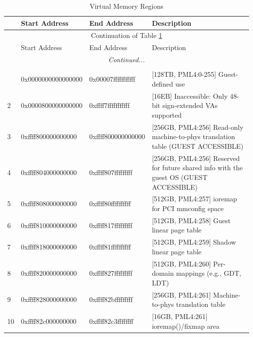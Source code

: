 \clearpage
\begin{longtable}{|m{2ex}|m{20ex}|m{18ex}|m{}|}
    \caption[Virtual Memory Regions]{Virtual Memory Regions \cite{xen_code} \label{tab:xen_address}}\\
    \hline
    & Start Address      & End Address        & Description \\
    \hline
    \hline
    \endfirsthead
    \hline
    \multicolumn{4}{|c|}{Continuation of Table \ref{tab:xen_address}}\\
    \hline
    \hline
    & Start Address      & End Address        & Description \\
    \hline
    \hline
    \endhead
    \hline
    \hline
    \multicolumn{4}{|c|}{\textit{Continued...}}\\
    \hline
    \endfoot
    \hline
    \hline
    \multicolumn{4}{|c|}{End of Table \ref{tab:xen_address}}\\
    \hline
    \endlastfoot
    1  & 0x0000000000000000  & 0x00007fffffffffff & [128TB, PML4:0-255] Guest-defined use \\
    \hline
    2  & 0x0000800000000000  & 0xffff7fffffffffff & [16EB] Inaccessible: Only 48-bit sign-extended VAs supported\\
    \hline
    3  & 0xffff800000000000  & 0xffff800000000000 & [256GB, PML4:256] Read-only machine-to-phys translation table (GUEST ACCESSIBLE) \\
    \hline
    4  & 0xffff804000000000  & 0xffff807fffffffff & [256GB, PML4:256] Reserved for future shared info with the guest OS (GUEST ACCESSIBLE) \\
    \hline
    5  & 0xffff808000000000  & 0xffff80ffffffffff & [512GB, PML4:257] ioremap for PCI mmconfig space \\
    \hline
    6  & 0xffff810000000000  & 0xffff817fffffffff & [512GB, PML4:258] Guest linear page table \\
    \hline
    7  & 0xffff818000000000  & 0xffff81ffffffffff & [512GB, PML4:259] Shadow linear page table \\
    \hline
    8  & 0xffff820000000000  & 0xffff827fffffffff & [512GB, PML4:260] Per-domain mappings (e.g., GDT, LDT) \\
    \hline
    9  & 0xffff828000000000  & 0xffff82bfffffffff & [256GB, PML4:261] Machine-to-phys translation table \\
    \hline
    10 & 0xffff82c000000000  & 0xffff82c3ffffffff & [16GB, PML4:261] ioremap()/fixmap area \\

\end{longtable}
